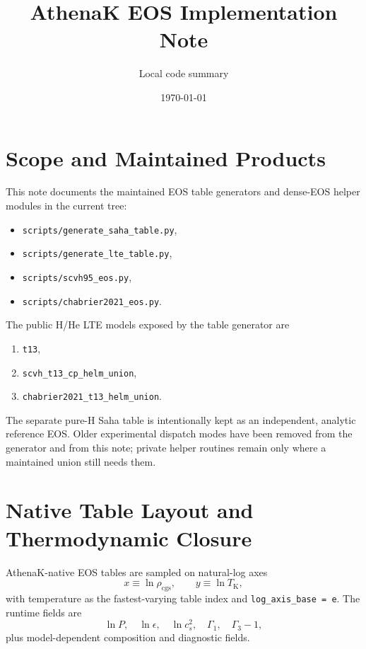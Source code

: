 \documentclass[11pt]{article}
\title{AthenaK EOS Implementation Note}
\author{Local code summary}
\date{\today}
\newcommand{\rhoCGS}{\rho_{\mathrm{cgs}}}
\newcommand{\TCGS}{T_{\mathrm K}}
\newcommand{\eps}{\epsilon}
\newcommand{\gammathree}{\Gamma_3-1}
\begin{document}
\maketitle

\section{Scope and Maintained Products}

This note documents the maintained EOS table generators and dense-EOS helper
modules in the current tree:
\begin{itemize}
  \item \texttt{scripts/generate\_saha\_table.py},
  \item \texttt{scripts/generate\_lte\_table.py},
  \item \texttt{scripts/scvh95\_eos.py},
  \item \texttt{scripts/chabrier2021\_eos.py}.
\end{itemize}
The public H/He LTE models exposed by the table generator are
\begin{enumerate}
  \item \texttt{t13},
  \item \texttt{scvh\_t13\_cp\_helm\_union},
  \item \texttt{chabrier2021\_t13\_helm\_union}.
\end{enumerate}
The separate pure-H Saha table is intentionally kept as an independent,
analytic reference EOS.  Older experimental dispatch modes have been removed
from the generator and from this note; private helper routines remain only
where a maintained union still needs them.

\section{Native Table Layout and Thermodynamic Closure}

AthenaK-native EOS tables are sampled on natural-log axes
\begin{equation}
  x \equiv \ln \rhoCGS, \qquad y \equiv \ln \TCGS,
\end{equation}
with temperature as the fastest-varying table index and
\texttt{log\_axis\_base = e}.  The runtime fields are
\begin{equation}
  \ln P,\quad \ln \eps,\quad \ln c_s^2,\quad
  \Gamma_1,\quad \gammathree,
\end{equation}
plus model-dependent composition and diagnostic fields.
\end{document}
